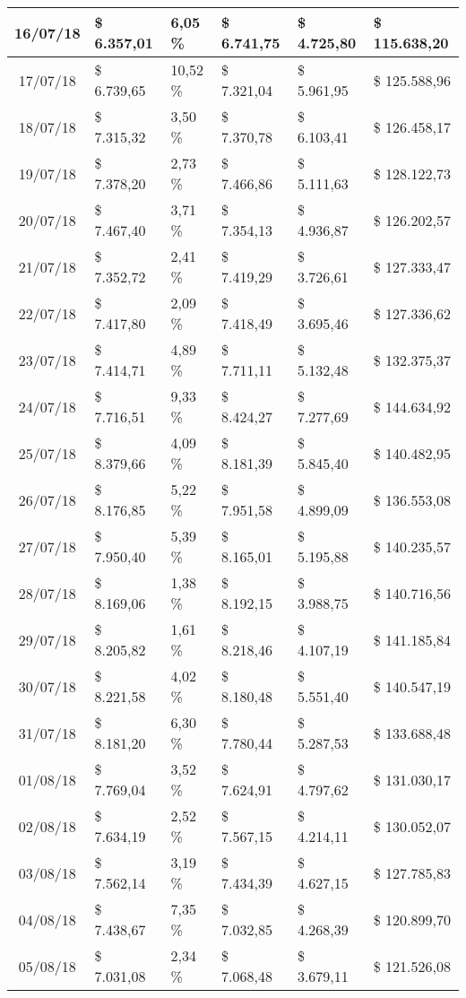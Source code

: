 \begin{small}
\begin{longtable}{|c|l|l|l|l|l|}
16/07/18 & \$ 6.357,01 & 6,05 \% & \$ 6.741,75 & \$ 4.725,80 & \$ 115.638,20 \\ \hline
17/07/18 & \$ 6.739,65 & 10,52 \% & \$ 7.321,04 & \$ 5.961,95 & \$ 125.588,96 \\ \hline
18/07/18 & \$ 7.315,32 & 3,50 \% & \$ 7.370,78 & \$ 6.103,41 & \$ 126.458,17 \\ \hline
19/07/18 & \$ 7.378,20 & 2,73 \% & \$ 7.466,86 & \$ 5.111,63 & \$ 128.122,73 \\ \hline
20/07/18 & \$ 7.467,40 & 3,71 \% & \$ 7.354,13 & \$ 4.936,87 & \$ 126.202,57 \\ \hline
21/07/18 & \$ 7.352,72 & 2,41 \% & \$ 7.419,29 & \$ 3.726,61 & \$ 127.333,47 \\ \hline
22/07/18 & \$ 7.417,80 & 2,09 \% & \$ 7.418,49 & \$ 3.695,46 & \$ 127.336,62 \\ \hline
23/07/18 & \$ 7.414,71 & 4,89 \% & \$ 7.711,11 & \$ 5.132,48 & \$ 132.375,37 \\ \hline
24/07/18 & \$ 7.716,51 & 9,33 \% & \$ 8.424,27 & \$ 7.277,69 & \$ 144.634,92 \\ \hline
25/07/18 & \$ 8.379,66 & 4,09 \% & \$ 8.181,39 & \$ 5.845,40 & \$ 140.482,95 \\ \hline
26/07/18 & \$ 8.176,85 & 5,22 \% & \$ 7.951,58 & \$ 4.899,09 & \$ 136.553,08 \\ \hline
27/07/18 & \$ 7.950,40 & 5,39 \% & \$ 8.165,01 & \$ 5.195,88 & \$ 140.235,57 \\ \hline
28/07/18 & \$ 8.169,06 & 1,38 \% & \$ 8.192,15 & \$ 3.988,75 & \$ 140.716,56 \\ \hline
29/07/18 & \$ 8.205,82 & 1,61 \% & \$ 8.218,46 & \$ 4.107,19 & \$ 141.185,84 \\ \hline
30/07/18 & \$ 8.221,58 & 4,02 \% & \$ 8.180,48 & \$ 5.551,40 & \$ 140.547,19 \\ \hline
31/07/18 & \$ 8.181,20 & 6,30 \% & \$ 7.780,44 & \$ 5.287,53 & \$ 133.688,48 \\ \hline
01/08/18 & \$ 7.769,04 & 3,52 \% & \$ 7.624,91 & \$ 4.797,62 & \$ 131.030,17 \\ \hline
02/08/18 & \$ 7.634,19 & 2,52 \% & \$ 7.567,15 & \$ 4.214,11 & \$ 130.052,07 \\ \hline
03/08/18 & \$ 7.562,14 & 3,19 \% & \$ 7.434,39 & \$ 4.627,15 & \$ 127.785,83 \\ \hline
04/08/18 & \$ 7.438,67 & 7,35 \% & \$ 7.032,85 & \$ 4.268,39 & \$ 120.899,70 \\ \hline
05/08/18 & \$ 7.031,08 & 2,34 \% & \$ 7.068,48 & \$ 3.679,11 & \$ 121.526,08 \\ \hline

\end{longtable}
\end{small}
